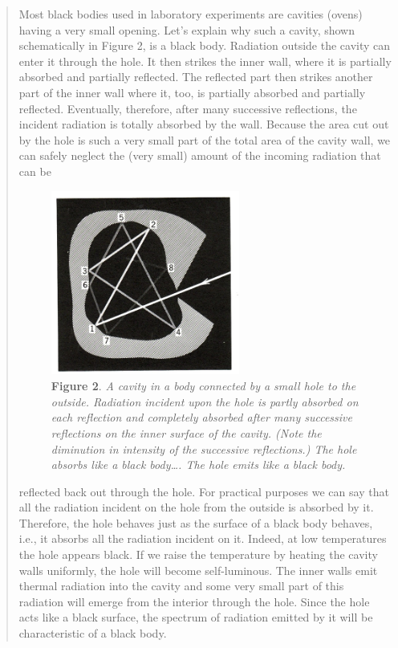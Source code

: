 \begin{quotation}
Most black bodies used in laboratory experiments are cavities (ovens)
having a very small opening. Let's explain why such a cavity, shown
schematically in Figure 2, is a black body. Radiation outside the cavity
can enter it through the hole. It then strikes the inner wall, where it
is partially absorbed and partially reflected. The reflected part then
strikes another part of the inner wall where it, too, is partially
absorbed and partially reflected. Eventually, therefore, after many
successive reflections, the incident radiation is totally absorbed by
the wall. Because the area cut out by the hole is such a very small part
of the total area of the cavity wall, we can safely neglect the (very
small) amount of the incoming radiation that can be
%
\begin{figure}[h]
  \centering
  \captionsetup{width=.75\textwidth}
  \includegraphics[width=2.4375in,height=2.38542in]{images/05_planck/image007.jpg}
  \caption*{\textbf{Figure 2}. \emph{A cavity in a body connected by a small hole to the
    outside. Radiation incident upon the hole is partly absorbed on each
    reflection and completely absorbed after many successive reflections on
    the inner surface of the cavity. (Note the diminution in intensity of
    the successive reflections.) The hole absorbs like a black body\ldots.
    The hole emits like a black body.}}
\end{figure}
%
reflected back out through the hole. For practical purposes we can say
that all the radiation incident on the hole from the outside is absorbed
by it. Therefore, the hole behaves just as the surface of a black body
behaves, i.e., it absorbs all the radiation incident on it. Indeed, at
low temperatures the hole appears black. If we raise the temperature by
heating the cavity walls uniformly, the hole will become self-luminous.
The inner walls emit thermal radiation into the cavity and some very
small part of this radiation will emerge from the interior through the
hole. Since the hole acts like a black surface, the spectrum of
radiation emitted by it will be characteristic of a black body.


\end{quotation}
